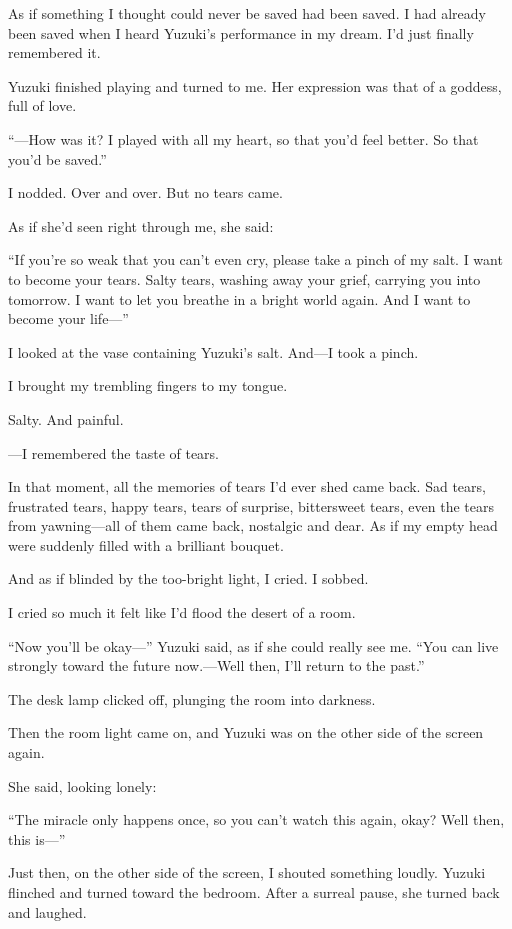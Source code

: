 \documentclass[
    a4paper,
    12pt,
    twoside,
    openany,
    UTF8,
    fontset=windows
]{ctexbook}
\begin{document}
As if something I thought could never be saved had been saved. I had already been saved when I heard Yuzuki's performance in my dream. I'd just finally remembered it.

Yuzuki finished playing and turned to me. Her expression was that of a goddess, full of love.

``---How was it? I played with all my heart, so that you'd feel better. So that you'd be saved.''

I nodded. Over and over. But no tears came.

As if she'd seen right through me, she said:

``If you're so weak that you can't even cry, please take a pinch of my salt. I want to become your tears. Salty tears, washing away your grief, carrying you into tomorrow. I want to let you breathe in a bright world again. And I want to become your life---''

I looked at the vase containing Yuzuki's salt. And---I took a pinch.

I brought my trembling fingers to my tongue.

Salty. And painful.

---I remembered the taste of tears.

In that moment, all the memories of tears I'd ever shed came back. Sad tears, frustrated tears, happy tears, tears of surprise, bittersweet tears, even the tears from yawning---all of them came back, nostalgic and dear. As if my empty head were suddenly filled with a brilliant bouquet.

And as if blinded by the too-bright light, I cried. I sobbed.

I cried so much it felt like I'd flood the desert of a room.

``Now you'll be okay---'' Yuzuki said, as if she could really see me. ``You can live strongly toward the future now.---Well then, I'll return to the past.''

The desk lamp clicked off, plunging the room into darkness.

Then the room light came on, and Yuzuki was on the other side of the screen again.

She said, looking lonely:

``The miracle only happens once, so you can't watch this again, okay? Well then, this is---''

Just then, on the other side of the screen, I shouted something loudly. Yuzuki flinched and turned toward the bedroom. After a surreal pause, she turned back and laughed.
\end{document}
